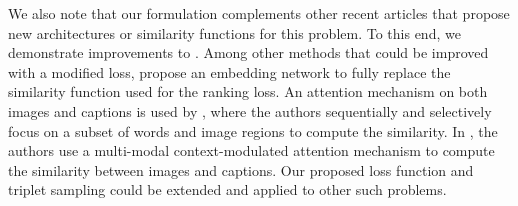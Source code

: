 We also note that our formulation complements other recent articles that 
propose new architectures or similarity functions for this problem. To this 
end, we demonstrate improvements to \cite{vendrov2015order}.
Among other methods that could be improved with a modified loss, 
\cite{wang2017learning} propose an embedding network to fully 
replace the similarity function used for the ranking loss.  An attention 
mechanism on both images and captions is used by \cite{nam2016dual}, where the 
authors sequentially and selectively focus on a subset of words and image 
regions to compute the similarity.  In \cite{huang2016instance}, the authors 
use a multi-modal context-modulated attention mechanism to compute the 
similarity between images and captions. Our proposed loss function and 
triplet sampling could be extended and applied to other such problems.





